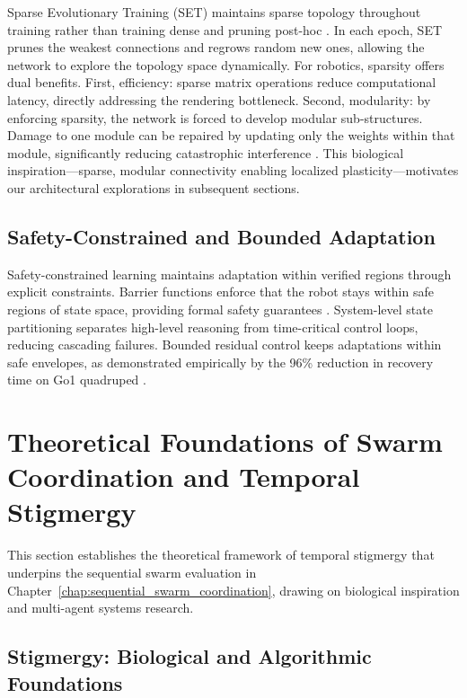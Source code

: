 \documentclass[12pt,a4paper,oneside]{report}
\begin{document}
Sparse Evolutionary Training (SET) maintains sparse topology throughout training rather than training dense and pruning post-hoc \cite{mocanu2018scalable}. In each epoch, SET prunes the weakest connections and regrows random new ones, allowing the network to explore the topology space dynamically. For robotics, sparsity offers dual benefits. First, efficiency: sparse matrix operations reduce computational latency, directly addressing the rendering bottleneck. Second, modularity: by enforcing sparsity, the network is forced to develop modular sub-structures. Damage to one module can be repaired by updating only the weights within that module, significantly reducing catastrophic interference \cite{frankle2018lottery, mocanu2018scalable}. This biological inspiration---sparse, modular connectivity enabling localized plasticity---motivates our architectural explorations in subsequent sections.
\subsection{Safety-Constrained and Bounded Adaptation}
\label{subsec:safety_constrained_and_bounded_adaptation}

Safety-constrained learning maintains adaptation within verified regions through explicit constraints. Barrier functions enforce that the robot stays within safe regions of state space, providing formal safety guarantees \cite{brunke2021safe}. System-level state partitioning separates high-level reasoning from time-critical control loops, reducing cascading failures. Bounded residual control keeps adaptations within safe envelopes, as demonstrated empirically by the 96\% reduction in recovery time on Go1 quadruped \cite{jayasinghe2026residual}.
\section{Theoretical Foundations of Swarm Coordination and Temporal Stigmergy}

This section establishes the theoretical framework of temporal stigmergy that underpins the sequential swarm evaluation in Chapter~\ref{chap:sequential_swarm_coordination}, drawing on biological inspiration and multi-agent systems research.
\subsection{Stigmergy: Biological and Algorithmic Foundations}
\label{subsec:stigmergy_biological_and_algorithmic_foundations}
\end{document}
